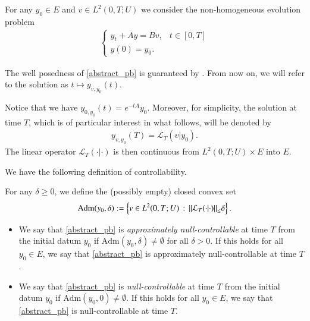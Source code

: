 For any $y_0\in E$ and $v\in L^2(0,T;U)$ we consider the non-homogeneous evolution problem  
\begin{align}\label{abstract_pb}
	\begin{cases}
		y_t+Ay=Bv, & t\in[0,T]
		\\
		y(0)=y_0.
	\end{cases}
\end{align}

The well posedness of \eqref{abstract_pb} is guaranteed by \cite[Theorem 2.37]{coron2007control}. From now on, we will refer to the solution as $t\mapsto y_{v,y_0}(t)$.

Notice that we have $y_{0,y_0}(t)= e^{-tA}y_0$. Moreover, for simplicity, the solution at time $T$, which is of particular interest in what follows, will be denoted by 
\begin{align*}
	y_{v,y_0}(T)=\mathcal{L}_T(v|y_0).
\end{align*} 
The linear operator $\mathcal{L}_T(\cdot|\cdot)$ is then continuous from $L^2(0,T;U)\times E$ into $E$.

We have the following definition of controllability.

\begin{definition}
For any $\delta\geq 0$, we define the (possibly empty) closed convex set 
\begin{align*}
	\textrm{Adm}(y_0,\delta):=\left\{v\in L^2(0,T;U)\,:\, {\left\|\mathcal{L}_T(\cdot|\cdot)\right\|}_{\leq}\delta\right\}.
\end{align*}
\begin{itemize}
	\item We say that \eqref{abstract_pb} is \textit{approximately null-controllable} at time $T$ from the initial datum $y_0$ if $\textrm{Adm}(y_0,\delta)\neq\emptyset$ for all $\delta>0$. If this holds for all $y_0\in E$, we say that \eqref{abstract_pb} is approximately null-controllable at time $T$. 
	
	\item We say that \eqref{abstract_pb} is \textit{null-controllable} at time $T$ from the initial datum $y_0$ if $\textrm{Adm}(y_0,0)\neq\emptyset$. If this holds for all $y_0\in E$, we say that \eqref{abstract_pb} is null-controllable at time $T$.
\end{itemize} 
\end{definition}

